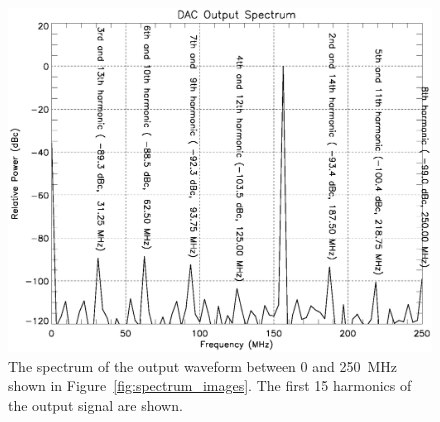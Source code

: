 \documentclass[12pt,letterpaper]{article}
\begin{document}
\begin{figure}[htbp]
  \centering
  \includegraphics[scale=0.8]{spectrum-harmonics.eps}
  \caption{The spectrum of the output waveform between 0 and 250~MHz
    shown in Figure~\ref{fig:spectrum_images}. The first 15 harmonics of
    the output signal are shown.}
  \label{fig:spectrum_harmonics}
\end{figure}
\end{document}

